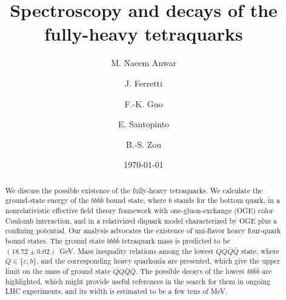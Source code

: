 \documentclass[twocolumn,showpacs,superscriptaddress,preprintnumbers,nofootinbib,prd]{revtex4-1}
\begin{document}
\title{Spectroscopy and decays of the fully-heavy tetraquarks}

\author{M. Naeem Anwar}

\author{J. Ferretti}

\author{F.-K. Guo}

\author{E. Santopinto}

\author{B.-S. Zou}

\date{\today}

\begin{abstract}

  We discuss the possible existence of the fully-heavy tetraquarks. We calculate
  the ground-state energy of the $bb \bar b \bar b$ bound state, where $b$
  stands for the bottom quark, in a nonrelativistic effective field theory
  framework with one-gluon-exchange (OGE) color Coulomb interaction, and in a
  relativized diquark model characterized by OGE plus a confining potential.
  Our analysis advocates the existence of uni-flavor heavy four-quark bound
  states. The ground state $bb\bar b\bar b$ tetraquark mass is predicted to be
  $(18.72\pm0.02)$~GeV. Mass inequality relations among the lowest
  $QQ\bar{Q}\bar{Q}$ state, where $Q\in \{c, b\}$, and the corresponding heavy
  quarkonia are presented, which give the upper limit on the mass of ground state
  $QQ\bar{Q}\bar{Q}$. The possible decays of the lowest $bb\bar{b}\bar{b}$
  are highlighted, which might provide useful references in the search for them in
  ongoing LHC experiments, and its width is estimated to be a few tens of MeV.

\end{abstract}
\end{document}
